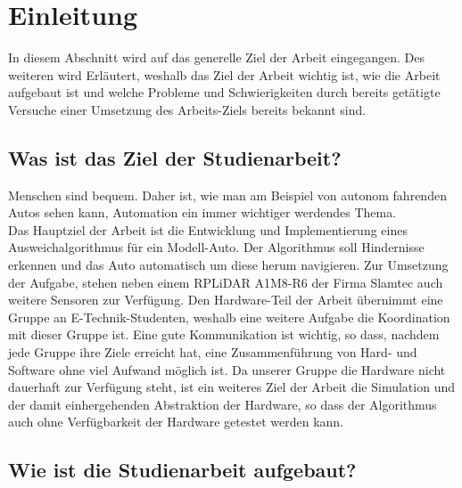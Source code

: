 \section{Einleitung}
In diesem Abschnitt wird auf das generelle Ziel der Arbeit eingegangen.
Des weiteren wird Erläutert, weshalb das Ziel der Arbeit wichtig ist, wie die Arbeit aufgebaut ist und welche Probleme und Schwierigkeiten durch bereits getätigte Versuche einer Umsetzung des Arbeits-Ziels bereits bekannt sind.

\subsection{Was ist das Ziel der Studienarbeit?}
    Menschen sind bequem. %
    Daher ist, wie man am Beispiel von autonom fahrenden Autos sehen kann, Automation ein immer wichtiger werdendes Thema.\\

    Das Hauptziel der Arbeit ist die Entwicklung und Implementierung eines Ausweichalgorithmus für ein Modell-Auto. 
    Der Algorithmus soll Hindernisse erkennen und das Auto automatisch um diese herum navigieren.
    Zur Umsetzung der Aufgabe, stehen neben einem RPLiDAR A1M8-R6 der Firma Slamtec auch weitere Sensoren zur Verfügung.
    Den Hardware-Teil der Arbeit übernimmt eine Gruppe an E-Technik-Studenten, weshalb eine weitere Aufgabe die Koordination mit dieser Gruppe ist.
    Eine gute Kommunikation ist wichtig, so dass, nachdem jede Gruppe ihre Ziele erreicht hat, eine Zusammenführung von Hard- und Software ohne viel Aufwand möglich ist.
    Da unserer Gruppe die Hardware nicht dauerhaft zur Verfügung steht, ist ein weiteres Ziel der Arbeit die Simulation und der damit einhergehenden Abstraktion der Hardware, so dass der Algorithmus auch ohne Verfügbarkeit der Hardware getestet werden kann.    

\subsection{Wie ist die Studienarbeit aufgebaut?}


